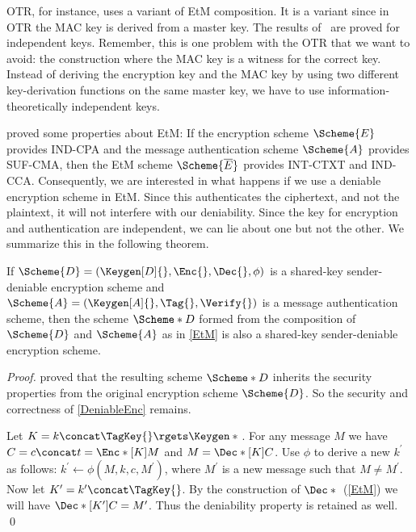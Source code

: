 \ac{OTR}, for instance, uses a variant of \ac{EtM} composition.
It is a variant since in \ac{OTR} the \ac{MAC} key is derived from a master 
key.
The results of~\cite{AuthEncryption} are proved for independent keys.
Remember, this is one problem with the \ac{OTR} that we want to avoid:
the construction where the \ac{MAC} key is a witness for the correct key.
Instead of deriving the encryption key and the \ac{MAC} key by using two 
different key-derivation functions on the same master key, we have to use 
information-theoretically independent keys.

\citet{AuthEncryption} proved some properties about \ac{EtM}:
If the encryption scheme \(\Scheme{E}\) provides \ac{IND-CPA} and the message 
authentication scheme \(\Scheme{A}\) provides \ac{SUF-CMA}, then the \ac{EtM} 
scheme \(\Scheme{\overline{E}}\) provides \ac{INT-CTXT} and \ac{IND-CCA}.
Consequently, we are interested in what happens if we use a deniable encryption 
scheme in \ac{EtM}.
Since this authenticates the ciphertext, and not the plaintext, it will not 
interfere with our deniability.
Since the key for encryption and authentication are independent, we can lie 
about one but not the other.
We summarize this in the following theorem.

\begin{theorem}\label{DeniableEtM}
  If \(\Scheme{D} = (\Keygen[D]{}, \Enc{}, \Dec{}, \phi)\) is a shared-key 
  sender-deniable encryption scheme and \(\Scheme{A} = (\Keygen[A]{}, \Tag{}, 
    \Verify{})\) is a message authentication scheme,
  then the scheme \(\Scheme*{D}\) formed from the composition of \(\Scheme{D}\) 
  and \(\Scheme{A}\) as in \cref{EtM} is also a shared-key sender-deniable 
  encryption scheme.
\end{theorem}
\begin{proof}
  \citet{AuthEncryption} proved that the resulting scheme \(\Scheme*{D}\) 
  inherits the security properties from the original encryption scheme 
  \(\Scheme{D}\).
  So the security and correctness of \cref{DeniableEnc} remains.

  Let \(K = k\concat \TagKey{} \rgets \Keygen*{}\).
  For any message \(M\) we have \(C = c\concat t = \Enc*[K]{ M }\) and \(M 
    = \Dec*[K]{ C }\).
  Use \(\phi\) to derive a new \(k^\prime\) as follows:
  \(k^\prime\gets \phi( M, k, c, M^\prime )\), where \(M^\prime\) is 
  a new message such that \(M\neq M^\prime\).
  Now let \(K^\prime = k^\prime\concat \TagKey{}\).
  By the construction of \(\Dec*{}\) (\cref{EtM}) we will have 
  \(\Dec*[K^\prime]{ C } = M^\prime\).
  Thus the deniability property is retained as well.
  \qed{}
\end{proof}

